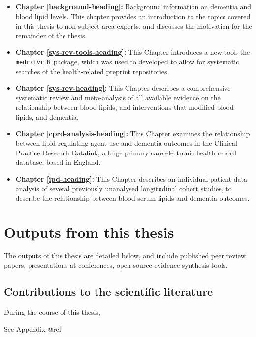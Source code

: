 \documentclass[a4paper,nobind]{templates/ociamthesis}
\providecommand{\tightlist}{%
  \setlength{\itemsep}{0pt}\setlength{\parskip}{0pt}}
\begin{document}
\begin{itemize}
\tightlist
\item
  \textbf{Chapter \ref{background-heading}:} Background information on dementia and blood lipid levels. This chapter provides an introduction to the topics covered in this thesis to non-subject area experts, and discusses the motivation for the remainder of the thesis.
\item
  \textbf{Chapter \ref{sys-rev-tools-heading}:} This Chapter introduces a new tool, the \texttt{medrxivr} R package, which was used to developed to allow for systematic searches of the health-related preprint repositories.
\item
  \textbf{Chapter \ref{sys-rev-heading}:} This Chapter describes a comprehensive systematic review and meta-analysis of all available evidence on the relationship between blood lipids, and interventions that modified blood lipids, and dementia.
\item
  \textbf{Chapter \ref{cprd-analysis-heading}:} This Chapter examines the relationship between lipid-regulating agent use and dementia outcomes in the Clinical Practice Research Datalink, a large primary care electronic health record database, based in England.
\item
  \textbf{Chapter \ref{ipd-heading}:} This Chapter describes an individual patient data analysis of several previously unanalysed longitudinal cohort studies, to describe the relationship between blood serum lipids and dementia outcomes.
\end{itemize}

\hypertarget{thesis-output}{%
\section{Outputs from this thesis}\label{thesis-output}}

The outputs of this thesis are detailed below, and include published peer review papers, presentations at conferences, open source evidence synthesis tools.

\hypertarget{contributions-to-the-scientific-literature}{%
\subsection{Contributions to the scientific literature}\label{contributions-to-the-scientific-literature}}

During the course of this thesis,

See Appendix @ref
\end{document}
